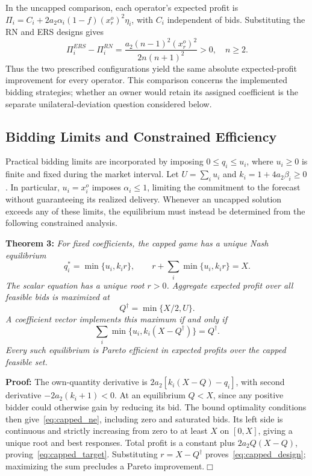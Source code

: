 \documentclass[journal]{IEEEtran}
\begin{document}
In the uncapped comparison, each operator's expected profit is $\Pi_i=C_i+2a_2\alpha_i(1-f)(x_r^o)^2\eta_i$, with $C_i$ independent of bids. Substituting the RN and ERS designs gives
\[
\Pi_i^{ERS}-\Pi_i^{RN}
=\frac{a_2(n-1)^2(x_r^o)^2}{2n(n+1)^2}>0,\quad n\geq2.
\]
Thus the two prescribed configurations yield the same absolute expected-profit improvement for every operator. This comparison concerns the implemented bidding strategies; whether an owner would retain its assigned coefficient is the separate unilateral-deviation question considered below.

\subsection{Bidding Limits and Constrained Efficiency}
\label{sec:bid_limits}
Practical bidding limits are incorporated by imposing $0\leq q_i\leq u_i$, where $u_i\geq0$ is finite and fixed during the market interval. Let $U=\sum_i u_i$ and $k_i=1+4a_2\beta_i\geq0$. In particular, $u_i=x_i^o$ imposes $\alpha_i\leq1$, limiting the commitment to the forecast without guaranteeing its realized delivery. Whenever an uncapped solution exceeds any of these limits, the equilibrium must instead be determined from the following constrained analysis.

\noindent\textbf{Theorem 3:} \textit{For fixed coefficients, the capped game has a unique Nash equilibrium
\begin{equation}
 q_i^*=\min\{u_i,k_i r\},\qquad
 r+\sum_i\min\{u_i,k_i r\}=X. \label{eq:capped_ne}
\end{equation}
The scalar equation has a unique root $r>0$. Aggregate expected profit over all feasible bids is maximized at
\begin{equation}
 Q^\dagger=\min\{X/2,U\}. \label{eq:capped_target}
\end{equation}
A coefficient vector implements this maximum if and only if
\begin{equation}
 \sum_i\min\{u_i,k_i(X-Q^\dagger)\}=Q^\dagger.
 \label{eq:capped_design}
\end{equation}
Every such equilibrium is Pareto efficient in expected profits over the capped feasible set.}

\noindent\textbf{Proof:} The own-quantity derivative is $2a_2[k_i(X-Q)-q_i]$, with second derivative $-2a_2(k_i+1)<0$. At an equilibrium $Q<X$, since any positive bidder could otherwise gain by reducing its bid. The bound optimality conditions then give~\eqref{eq:capped_ne}, including zero and saturated bids. Its left side is continuous and strictly increasing from zero to at least $X$ on $[0,X]$, giving a unique root and best responses. Total profit is a constant plus $2a_2Q(X-Q)$, proving~\eqref{eq:capped_target}. Substituting $r=X-Q^\dagger$ proves~\eqref{eq:capped_design}; maximizing the sum precludes a Pareto improvement.\hfill$\Box$
\end{document}
